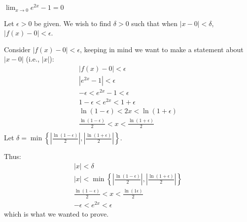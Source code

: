 {$\displaystyle \lim_{x\to 0} e^{2x}-1 = 0$}
{Let $\epsilon >0$ be given. We wish to find $\delta >0$ such that when $|x-0|<\delta$, $|f(x)-0|<\epsilon$. 

Consider $|f(x)-0|<\epsilon$, keeping in  mind we want to make a statement about $|x-0|$ (i.e., $|x|$):
\begin{gather*}
|f(x) -0 | < \epsilon \\
|e^{2x}-1 |<\epsilon \\
-\epsilon< e^{2x}-1 < \epsilon \\
1-\epsilon< e^{2x} < 1+\epsilon \\
\ln (1-\epsilon) < 2x < \ln (1+\epsilon) \\
\frac{\ln (1-\epsilon)}{2} < x < \frac{\ln (1+\epsilon)}{2} \\
\end{gather*}
Let $\delta = \min\left\{\left|\frac{\ln(1-\epsilon)}{2}\right|,\left|\frac{\ln(1+\epsilon)}{2}\right|\right\}.$

Thus:
\begin{gather*}
|x| < \delta \\
|x| < \min\left\{\left|\frac{\ln(1-\epsilon)}{2}\right|,\left|\frac{\ln(1+\epsilon)}{2}\right|\right\} \\
\frac{\ln(1-\epsilon)}{2} < x < \frac{\ln(1\epsilon)}{2}\\
-\epsilon < e^{2x} < \epsilon
\end{gather*}
which is what we wanted to prove.
}




